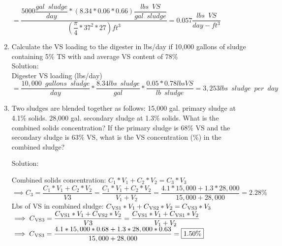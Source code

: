\begin{enumerate}
                        {
                        $=\dfrac
                            {
                                5000
                                \dfrac
                                    {gal \enspace sludge}
                                    {day}
                                *(8.34*0.06*0.66) 
                                \dfrac
                                    {lbs \enspace VS}
                                    {gal \enspace  sludge}
                            }
                            {
                                (\dfrac
                                    {\pi}
                                    {4}*37^2*27)ft^3
                            }
                        =\boxed
                            {
                                0.057 \dfrac
                                    {lbs \enspace VS}
                                    {day-ft^3}
                            }
                        $}

                    \item Calculate the VS loading to the digester in lbs/day if 10,000 gallons of sludge containing 5\% TS with and average VS content of 78\%\\
                    Solution:\\
                    Digester VS loading (lbs/day)\\$=\dfrac{10,000 \enspace gallons \enspace sludge}{day}*\dfrac{8.34lbs \enspace sludge}{gal}*\dfrac{0.05*0.78lbs VS}{lb \enspace sludge}=\boxed{3,253lbs \enspace sludge \enspace per \enspace day}$

                    \item Two sludges are blended together as follows: 15,000 gal. primary sludge at 4.1\% solids. 28,000 gal. secondary sludge at 1.3\% solids. What is the combined solids concentration?  If the primary sludge is 68\% VS and the secondary sludge is 63\% VS, what is the VS concentration (\%) in the combined sludge?

                    Solution:

                    Combined solids concentration:
                    $
                    C_1*V_1 + C_2*V_2 = C_3*V_3$\\
                    $\implies C_3 = \dfrac{C_1*V_1 + C_2*V_2}{V3}=\dfrac{C_1*V_1 + C_2*V_2}{V_1 + V_2}=\dfrac{4.1*15,000 + 1.3*28,000}{15,000 + 28,000}=\boxed{2.28\%}
                    $\\
                    Lbs of VS in combined sludge:
                    $
                    C\textsubscript{VS1}*V_1 + C\textsubscript{VS2}*V_2 = C\textsubscript{VS3}*V_3$\\
                    $\implies C\textsubscript{VS3} = \dfrac{C\textsubscript{VS1}*V_1 + C\textsubscript{VS2}*V_2}{V3}=\dfrac{C\textsubscript{VS1}*V_1 + C\textsubscript{VS1}*V_2}{V_1 + V_2}$\\
                    $\implies C\textsubscript{VS3}
                    =\dfrac{4.1*15,000*0.68 + 1.3*28,000*0.63}{15,000 + 28,000}=\boxed{1.50\%}$
                    \\
                \end{enumerate}
